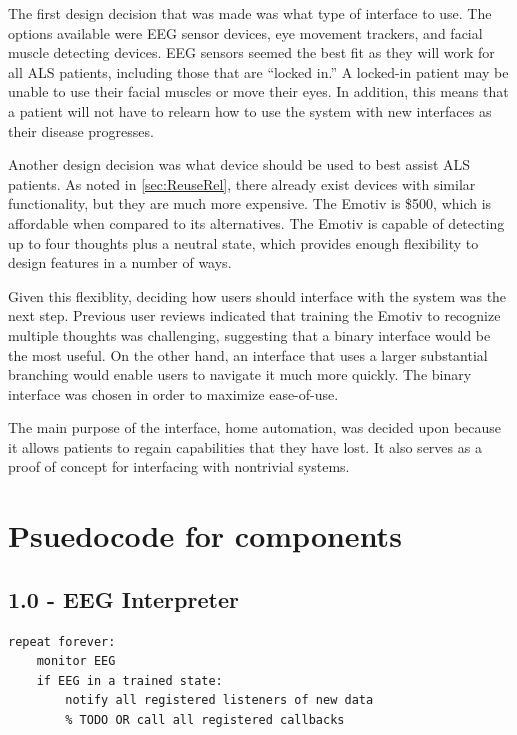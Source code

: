 \documentclass{article}
\begin{document}
The first design decision that was made was what type of interface to use.
The options available were EEG sensor devices, eye movement trackers, and
facial muscle detecting devices. EEG sensors seemed the best fit as they
will work for all ALS patients, including those that are ``locked in.'' A
locked-in patient may be unable to use their facial muscles or move their
eyes. In addition, this means that a patient will not have to relearn how to
use the system with new interfaces as their disease progresses.

Another design decision was what device should be used to best assist ALS
patients. As noted in \autoref{sec:ReuseRel}, there already exist devices with
similar functionality, but they are much more expensive. The Emotiv is \$500,
which is affordable when compared to its alternatives. The Emotiv is capable
of detecting up to four thoughts plus a neutral state, which provides enough
flexibility to design features in a number of ways.

Given this flexiblity, deciding how users should interface with the system was
the next step. Previous user reviews indicated that training the Emotiv to
recognize multiple thoughts was challenging, suggesting that a binary
interface would be the most useful. On the other hand, an interface that uses
a larger substantial branching would enable users to navigate it much more
quickly. The binary interface was chosen in order to maximize ease-of-use.

The main purpose of the interface, home automation, was decided upon because
it allows patients to regain capabilities that they have lost. It also
serves as a proof of concept for interfacing with nontrivial systems.

\newpage

\section{Psuedocode for components}

\subsection*{1.0 - EEG Interpreter}

\begin{lstlisting}
repeat forever:
    monitor EEG
    if EEG in a trained state:
        notify all registered listeners of new data
        % TODO OR call all registered callbacks
\end{lstlisting}
\end{document}
